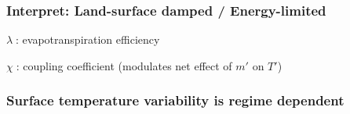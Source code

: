 \begin{frame}
\frametitle{Interpret: {\large Land-surface damped / Energy-limited}}

\vspace*{-1.5em}

\begin{itemize}

\itemDiamond $\lambda\;$: evapotranspiration efficiency 

\itemDiamond $\chi\;$: coupling coefficient (modulates net effect of $m'$ on $T'$)

\end{itemize}

\begin{center}

\ifdraft{}{%
%
\resizebox{\linewidth}{!}{} }

\vspace*{1.5em}
\tikzitemMark

\end{center}


\end{frame}

\begin{frame}
\frametitle{\large Surface temperature variability is regime dependent}


\ifdraft{}{%
%
\resizebox{\linewidth}{!}{} }


\end{frame}

